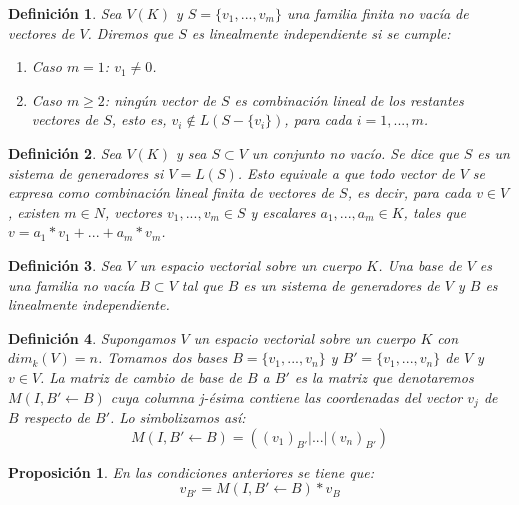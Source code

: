 \documentclass[a4paper,11pt, oneside]{book}
\newtheorem{defi}{Definición}
\newtheorem{prop}{Proposición}
\begin{document}
\begin{defi}
	Sea $V(K)$ y $S = \{v_1,...,v_m\}$ una familia finita no vacía de vectores de $V$. Diremos que $S$ es linealmente independiente si se cumple:
	\begin{enumerate}
		\item Caso $m=1$: $v_1 \neq 0$.
		\item Caso $m \geq 2$: ningún vector de $S$ es combinación lineal de los restantes vectores de $S$, esto es, $v_i \notin L(S -\{v_i\})$, para cada $i=1,...,m$.
	\end{enumerate}
\end{defi}
\begin{defi}
	Sea $V(K)$ y sea $S \subset V$ un conjunto no vacío. Se dice que $S$ es un sistema de generadores si $V = L(S)$. Esto equivale a que todo vector de $V$ se expresa como combinación lineal finita de vectores de $S$, es decir, para cada $v \in V$, existen $m \in N$, vectores $v_1,...,v_m \in S$ y escalares $a_1,...,a_m \in K$, tales que $v = a_1*v_1+...+a_m*v_m$.
\end{defi}
\begin{defi}
	Sea $V$ un espacio vectorial sobre un cuerpo $K$. Una base de $V$ es una familia no vacía $B \subset V$ tal que $B$ es un sistema de generadores de $V$ y $B$ es linealmente independiente.
\end{defi}
\begin{defi}
	Supongamos $V$ un espacio vectorial sobre un cuerpo $K$ con $dim_k(V) = n$. Tomamos dos bases $B = \{v_1,...,v_n\}$ y $B' = \{v_1,...,v_n\}$ de $V$ y $ v \in V$. La matriz de cambio de base de $B$ a $B'$ es la matriz que denotaremos $M(I, B' \leftarrow B)$ cuya columna j-ésima contiene las coordenadas del vector $v_j$ de $B$ respecto de $B'$. Lo simbolizamos así:
	\begin{equation}
	M(I, B' \leftarrow B) = ((v_1)_{B'} | ... |(v_n)_{B'})
	\end{equation}
\end{defi}
\begin{prop}
	En las condiciones anteriores se tiene que:
	\begin{equation}
	v_{B'} = M(I, B' \leftarrow B)* v_B
	\end{equation}
\end{prop}
\end{document}
